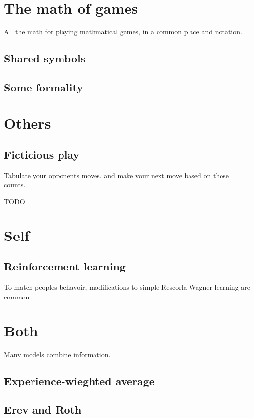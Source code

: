 \documentclass[8pt]{article}
\begin{document}
\section*{The math of games}
All the math for playing mathmatical games, in a common place and notation.

\begin{multicols}{4}

\subsection*{Shared symbols}

\subsection*{Some formality}


\section*{Others}
\subsection*{Ficticious play}
Tabulate your opponents moves, and make your next move based on those counts.

TODO

\section*{Self}
\subsection*{Reinforcement learning}

To match peoples behavoir, modifications to simple Rescorla-Wagner learning are common.

\section*{Both}
Many models combine information.

\subsection*{Experience-wieghted average}

\subsection*{Erev and Roth}



\end{multicols}
\end{document}
